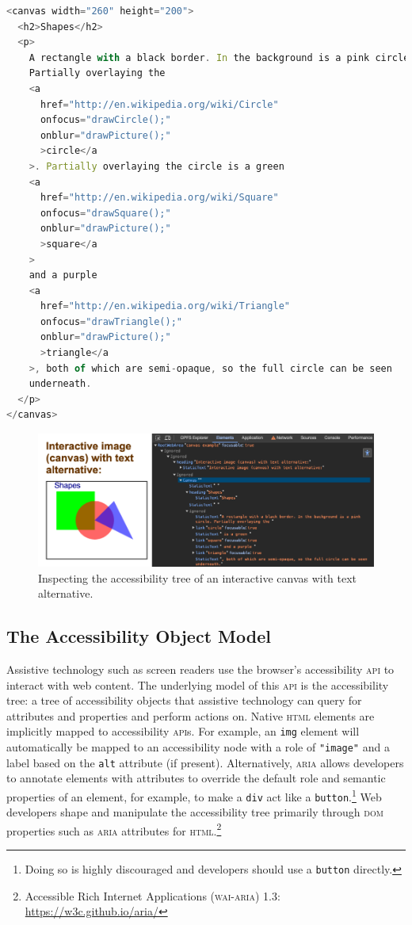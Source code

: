 \documentclass[sigconf]{acmart}
\begin{document}
\begin{lstlisting}[language=JavaScript, style=ES6, label={lst:canvas}, caption={Interactive canvas with text alternative. (Source: \url{https://www.html5accessibility.com/tests/canvas.html})}]
<canvas width="260" height="200">
  <h2>Shapes</h2>
  <p>
    A rectangle with a black border. In the background is a pink circle.
    Partially overlaying the
    <a
      href="http://en.wikipedia.org/wiki/Circle"
      onfocus="drawCircle();"
      onblur="drawPicture();"
      >circle</a
    >. Partially overlaying the circle is a green
    <a
      href="http://en.wikipedia.org/wiki/Square"
      onfocus="drawSquare();"
      onblur="drawPicture();"
      >square</a
    >
    and a purple
    <a
      href="http://en.wikipedia.org/wiki/Triangle"
      onfocus="drawTriangle();"
      onblur="drawPicture();"
      >triangle</a
    >, both of which are semi-opaque, so the full circle can be seen
    underneath.
  </p>
</canvas>
\end{lstlisting}

\begin{figure}[h]
\includegraphics[width=\columnwidth]{canvas.png}
\caption{Inspecting the accessibility tree of an interactive canvas with text alternative.}
\label{fig:canvas}
\end{figure}

\subsection{The Accessibility Object Model}

Assistive technology such as screen readers use the browser's accessibility \textsc{api} to interact with web content. The underlying model of this \textsc{api} is the accessibility tree: a tree of accessibility objects that assistive technology can query for attributes and properties and perform actions on. Native \textsc{html} elements are implicitly mapped to accessibility \textsc{api}s. For example, an \texttt{img} element will automatically be mapped to an accessibility node with a role of \texttt{"image"} and a label based on the \texttt{alt} attribute (if present). Alternatively, \textsc{aria} allows developers to annotate elements with attributes to override the default role and semantic properties of an element, for example, to make a \texttt{div} act like a \texttt{button}.\footnote{Doing so is highly discouraged and developers should use a \texttt{button} directly.} Web developers shape and manipulate the accessibility tree primarily through \textsc{dom} properties such as \textsc{aria} attributes for \textsc{html}.\footnote{Accessible Rich Internet Applications (\textsc{wai}-\textsc{aria}) 1.3: \url{https://w3c.github.io/aria/}}
\end{document}

